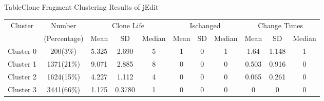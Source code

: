 \begin{table}[htbp]
{Table$\!$}{Clone Fragment Clustering Results of jEdit}
\vspace{0.5em}
\centering
\footnotesize
\begin{tabular}{ccccccccccc}
\toprule[1.5pt]
\multirow{2}{*}{Cluster}&{Number}&\multicolumn{3}{c}{Clone Life}&\multicolumn{3}{c}{Ischanged}&\multicolumn{3}{c}{Change Times} \\
&(Percentage)&{Mean}&SD &{Median}&{Mean}&SD&{Median}&{Mean}&SD &{Median}\\
\midrule[1pt]
Cluster 0&200(3\%)&5.325&2.690&5&1	&0	&1	&1.64	&1.148&1\\ 
Cluster 1&1371(21\%)	&9.071&2.885&8	&0	&0	&0	&0.503&0.916&0\\ 
Cluster 2&	1624(15\%)	&4.227&1.112&4	&0	&0	&0	&0.065&0.261&0\\ 
Cluster 3&	3441(66\%)	&1.175	&0.3780&1	&0	&0	&0	&0	&0	&0\\ 
\bottomrule[1.5pt]
\end{tabular}
\end{table}

